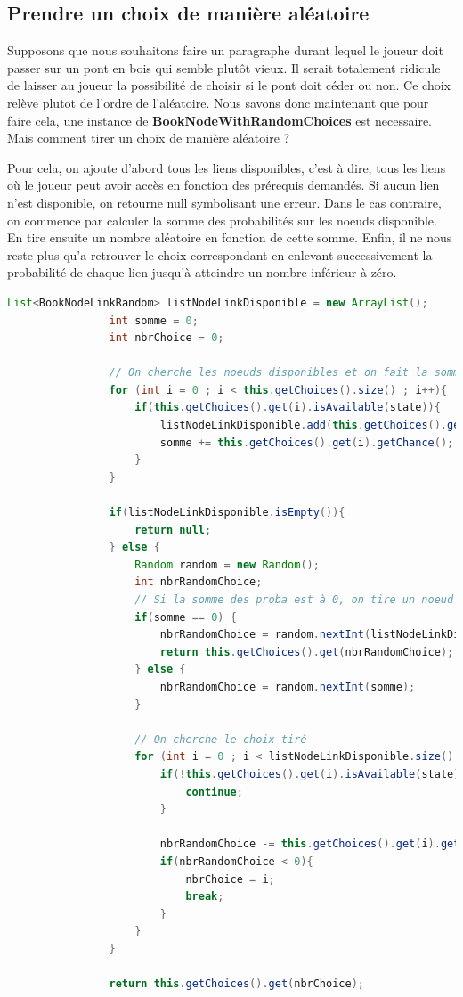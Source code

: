 		\subsection{Prendre un choix de manière aléatoire}

			Supposons que nous souhaitons faire un paragraphe durant lequel le joueur doit passer sur un pont en bois qui semble plutôt vieux. Il serait totalement ridicule de laisser au joueur la possibilité de choisir si le pont doit céder ou non. Ce choix relève plutot de l'ordre de l'aléatoire. Nous savons donc maintenant que pour faire cela, une instance de \textbf{BookNodeWithRandomChoices} est necessaire. Mais comment tirer un choix de manière aléatoire ?

			Pour cela, on ajoute d'abord tous les liens disponibles, c'est à dire, tous les liens où le joueur peut avoir accès en fonction des prérequis demandés. Si aucun lien n'est disponible, on retourne null symbolisant une erreur. Dans le cas contraire, on commence par calculer la somme des probabilités sur les noeuds disponible. En tire ensuite un nombre aléatoire en fonction de cette somme. Enfin, il ne nous reste plus qu'a retrouver le choix correspondant en enlevant successivement la probabilité de chaque lien jusqu'à atteindre un nombre inférieur à zéro.

			\begin{lstlisting}[gobble=16, language=java, label=lst:getRandomChoices, caption=getRandomChoice()]
				List<BookNodeLinkRandom> listNodeLinkDisponible = new ArrayList();
				int somme = 0;
				int nbrChoice = 0;

				// On cherche les noeuds disponibles et on fait la somme des probabilités
				for (int i = 0 ; i < this.getChoices().size() ; i++){
					if(this.getChoices().get(i).isAvailable(state)){
						listNodeLinkDisponible.add(this.getChoices().get(i));
						somme += this.getChoices().get(i).getChance();
					}
				}

				if(listNodeLinkDisponible.isEmpty()){
					return null;
				} else {
					Random random = new Random();
					int nbrRandomChoice;
					// Si la somme des proba est à 0, on tire un noeud au hasard
					if(somme == 0) {
						nbrRandomChoice = random.nextInt(listNodeLinkDisponible.size());
						return this.getChoices().get(nbrRandomChoice);
					} else {
						nbrRandomChoice = random.nextInt(somme);
					}

					// On cherche le choix tiré
					for (int i = 0 ; i < listNodeLinkDisponible.size() ; i++){
						if(!this.getChoices().get(i).isAvailable(state)){
							continue;
						}

						nbrRandomChoice -= this.getChoices().get(i).getChance();
						if(nbrRandomChoice < 0){
							nbrChoice = i;
							break;
						}
					}
				}

				return this.getChoices().get(nbrChoice);
			\end{lstlisting}

